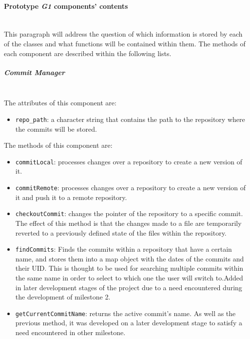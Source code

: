 \paragraph{Prototype \emph{G1} components' contents}\mbox{}\\

This paragraph will address the question of which information is stored by each of the classes and what functions will be contained within them. The methods of each component 
are described within the following lists.

\subparagraph{Commit Manager}\mbox{}\\


The attributes of this component are:

\begin{itemize}
    \item \texttt{repo\_path}: a character string that contains the path to the repository where the commits will be stored.
\end{itemize}

The methods of this component are:

\begin{itemize}
    \item \texttt{commitLocal}: processes changes over a repository to create a new version of it.
    \item \texttt{commitRemote}: processes changes over a repository to create a new version of it and push it to a remote repository.
    \item \texttt{checkoutCommit}: changes the pointer of the repository to a specific commit. The effect of this method is that the changes made to a file are temporarily 
    reverted to a previously defined state of the files within the repository. 
    \item \texttt{findCommits}: Finds the commits within a repository that have a certain name, and stores them into a map object with the dates of the commits and their UID.
    This is thought to be used for searching multiple commits within the same name in order to select to which one the user will switch to.Added in later development stages of the project due to a need encountered during the development of milestone 2.
    \item \texttt{getCurrentCommitName}: returns the active commit's name. As well as the previous method, it was developed on a later development stage to satisfy a need encountered in other milestone.
\end{itemize}

